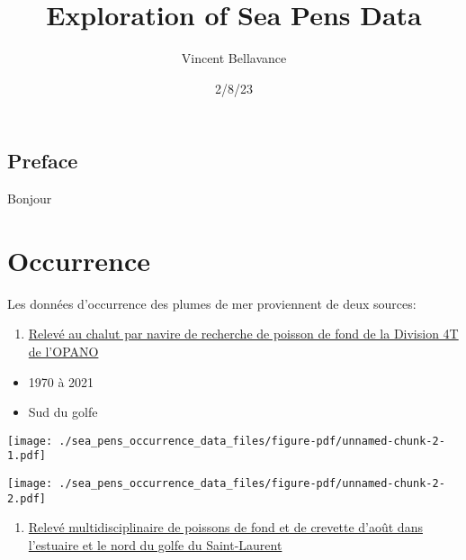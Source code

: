 \documentclass[
  letterpaper,
  DIV=11,
  numbers=noendperiod]{scrreprt}
\title{Exploration of Sea Pens Data}
\author{Vincent Bellavance}
\date{2/8/23}
\providecommand{\tightlist}{%
  \setlength{\itemsep}{0pt}\setlength{\parskip}{0pt}}\usepackage{longtable,booktabs,array}
\renewcommand*\contentsname{Table of contents}
\newcommand\contentsname{Table of contents}
\begin{document}
\maketitle
\ifdefined\Shaded\renewenvironment{Shaded}{\begin{tcolorbox}[boxrule=0pt, enhanced, breakable, borderline west={3pt}{0pt}{shadecolor}, interior hidden, sharp corners, frame hidden]}{\end{tcolorbox}}\fi

\renewcommand*\contentsname{Table of contents}
{
\hypersetup{linkcolor=}
\setcounter{tocdepth}{2}
\tableofcontents
}

\hypertarget{preface}{%
\chapter*{Preface}\label{preface}}


Bonjour

\part{Occurrence}

Les données d'occurrence des plumes de mer proviennent de deux sources:

\begin{enumerate}
\def\labelenumi{\arabic{enumi}.}
\tightlist
\item
  \href{https://open.canada.ca/data/fr/dataset/1989de32-bc5d-c696-879c-54d422438e64}{Relevé
  au chalut par navire de recherche de poisson de fond de la Division 4T
  de l'OPANO}
\end{enumerate}

\begin{itemize}
\tightlist
\item
  1970 à 2021
\item
  Sud du golfe
\end{itemize}

\texttt{[image: ./sea\_pens\_occurrence\_data\_files/figure-pdf/unnamed-chunk-2-1.pdf]}

\texttt{[image: ./sea\_pens\_occurrence\_data\_files/figure-pdf/unnamed-chunk-2-2.pdf]}

\begin{enumerate}
\def\labelenumi{\arabic{enumi}.}
\setcounter{enumi}{1}
\tightlist
\item
  \href{https://open.canada.ca/data/fr/dataset/40381c35-4849-4f17-a8f3-707aa6a53a9d}{Relevé
  multidisciplinaire de poissons de fond et de crevette d'août dans
  l'estuaire et le nord du golfe du Saint-Laurent}
\end{enumerate}
\end{document}
